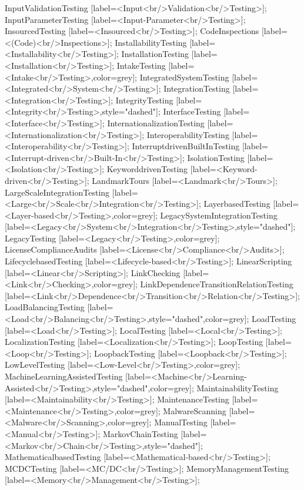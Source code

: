 \documentclass{article}
\begin{document}
{InputValidationTesting [label=<Input<br/>Validation<br/>Testing>];
InputParameterTesting [label=<Input-Parameter<br/>Testing>];
InsourcedTesting [label=<Insourced<br/>Testing>];
CodeInspections [label=<(Code)<br/>Inspections>];
InstallabilityTesting [label=<Installability<br/>Testing>];
InstallationTesting [label=<Installation<br/>Testing>];
IntakeTesting [label=<Intake<br/>Testing>,color=grey];
IntegratedSystemTesting [label=<Integrated<br/>System<br/>Testing>];
IntegrationTesting [label=<Integration<br/>Testing>];
IntegrityTesting [label=<Integrity<br/>Testing>,style="dashed"];
InterfaceTesting [label=<Interface<br/>Testing>];
InternationalizationTesting [label=<Internationalization<br/>Testing>];
InteroperabilityTesting [label=<Interoperability<br/>Testing>];
InterruptdrivenBuiltInTesting [label=<Interrupt-driven<br/>Built-In<br/>Testing>];
IsolationTesting [label=<Isolation<br/>Testing>];
KeyworddrivenTesting [label=<Keyword-driven<br/>Testing>];
LandmarkTours [label=<Landmark<br/>Tours>];
LargeScaleIntegrationTesting [label=<Large<br/>Scale<br/>Integration<br/>Testing>];
LayerbasedTesting [label=<Layer-based<br/>Testing>,color=grey];
LegacySystemIntegrationTesting [label=<Legacy<br/>System<br/>Integration<br/>Testing>,style="dashed"];
LegacyTesting [label=<Legacy<br/>Testing>,color=grey];
LicenseComplianceAudits [label=<License<br/>Compliance<br/>Audits>];
LifecyclebasedTesting [label=<Lifecycle-based<br/>Testing>];
LinearScripting [label=<Linear<br/>Scripting>];
LinkChecking [label=<Link<br/>Checking>,color=grey];
LinkDependenceTransitionRelationTesting [label=<Link<br/>Dependence<br/>Transition<br/>Relation<br/>Testing>];
LoadBalancingTesting [label=<Load<br/>Balancing<br/>Testing>,style="dashed",color=grey];
LoadTesting [label=<Load<br/>Testing>];
LocalTesting [label=<Local<br/>Testing>];
LocalizationTesting [label=<Localization<br/>Testing>];
LoopTesting [label=<Loop<br/>Testing>];
LoopbackTesting [label=<Loopback<br/>Testing>];
LowLevelTesting [label=<Low-Level<br/>Testing>,color=grey];
MachineLearningAssistedTesting [label=<Machine<br/>Learning-Assisted<br/>Testing>,style="dashed",color=grey];
MaintainabilityTesting [label=<Maintainability<br/>Testing>];
MaintenanceTesting [label=<Maintenance<br/>Testing>,color=grey];
MalwareScanning [label=<Malware<br/>Scanning>,color=grey];
ManualTesting [label=<Manual<br/>Testing>];
MarkovChainTesting [label=<Markov<br/>Chain<br/>Testing>,style="dashed"];
MathematicalbasedTesting [label=<Mathematical-based<br/>Testing>];
MCDCTesting [label=<MC/DC<br/>Testing>];
MemoryManagementTesting [label=<Memory<br/>Management<br/>Testing>];
}
\end{document}
